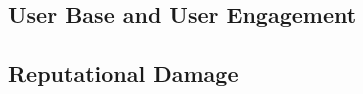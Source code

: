 \documentclass[12pt, a4paper]{article}
\begin{document}

\subsection*{User Base and User Engagement}


\subsection*{Reputational Damage}




\end{document}
